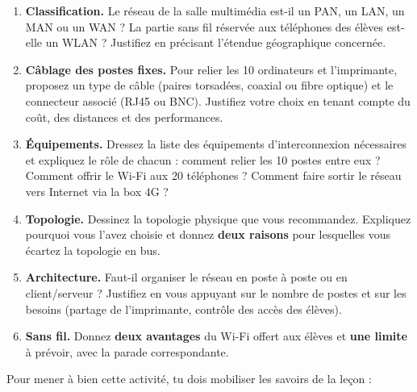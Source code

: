 \documentclass[11pt]{article}
\newcounter{popsec}
\newcounter{popsub}
\newcommand{\courssub}[1]{%
  \stepcounter{popsub}%
  \par\vspace{9pt}\noindent{\popxbold\fontsize{11.5}{13}\selectfont\color{popink}{\color{poporange}\thepopsec.\thepopsub}\hspace{6pt}#1}\par\nopagebreak\vspace{4pt}
}
\begin{document}
\begin{enumerate}
  \item \textbf{Classification.} Le réseau de la salle multimédia est-il un PAN, un LAN, un MAN ou un WAN ? La partie sans fil réservée aux téléphones des élèves est-elle un WLAN ? Justifiez en précisant l'étendue géographique concernée.
  \item \textbf{Câblage des postes fixes.} Pour relier les 10 ordinateurs et l'imprimante, proposez un type de câble (paires torsadées, coaxial ou fibre optique) et le connecteur associé (RJ45 ou BNC). Justifiez votre choix en tenant compte du coût, des distances et des performances.
  \item \textbf{Équipements.} Dressez la liste des équipements d'interconnexion nécessaires et expliquez le rôle de chacun : comment relier les 10 postes entre eux ? Comment offrir le Wi-Fi aux 20 téléphones ? Comment faire sortir le réseau vers Internet via la box 4G ?
  \item \textbf{Topologie.} Dessinez la topologie physique que vous recommandez. Expliquez pourquoi vous l'avez choisie et donnez \textbf{deux raisons} pour lesquelles vous écartez la topologie en bus.
  \item \textbf{Architecture.} Faut-il organiser le réseau en poste à poste ou en client/serveur ? Justifiez en vous appuyant sur le nombre de postes et sur les besoins (partage de l'imprimante, contrôle des accès des élèves).
  \item \textbf{Sans fil.} Donnez \textbf{deux avantages} du Wi-Fi offert aux élèves et \textbf{une limite} à prévoir, avec la parade correspondante.
\end{enumerate}

\courssub{Ressources à mobiliser}

Pour mener à bien cette activité, tu dois mobiliser les savoirs de la leçon :
\end{document}

